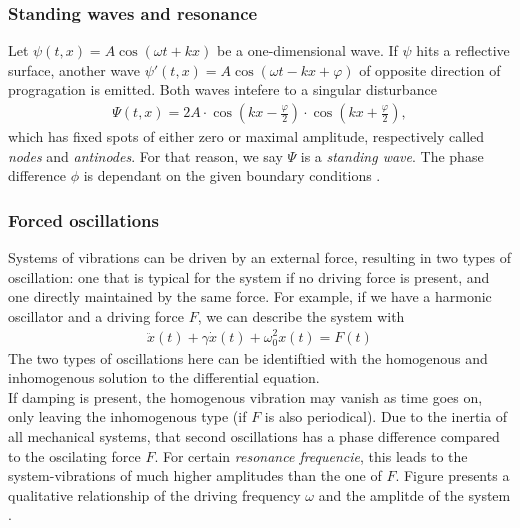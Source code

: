 \documentclass{subfiles}
\begin{document}
        \subsubsection*{Standing waves and resonance}
        Let $\psi(t,x)=A\cos(\omega t+kx)$ be a one-dimensional wave. If $\psi$ hits a reflective surface, another wave $\psi'(t,x)=A\cos(\omega t-kx+\varphi)$ of opposite direction of progragation is emitted. Both waves intefere to a singular disturbance
        \begin{align*}
            \Psi(t,x)=2A\cdot\cos(kx-\frac{\varphi}{2})\cdot\cos(kx+\frac{\varphi}{2}),
        \end{align*}
        which has fixed spots of either zero or maximal amplitude, respectively called \textit{nodes} and \textit{antinodes}. For that reason, we say $\Psi$ is a \textit{standing wave}. The phase difference $\phi$ is dependant on the given boundary conditions \cite[p.405]{demtroeder1.9}.\\

        \subsubsection*{Forced oscillations}
            Systems of vibrations can be driven by an external force, resulting in two types of oscillation: one that is typical for the system if no driving force is present, and one directly maintained by the same force. For example, if we have a harmonic oscillator and a driving force $F$, we can describe the system with
            \begin{align*}
                \ddot x(t)+\gamma\dot x(t)+\omega_0^2x(t)=F(t)
            \end{align*}
            The two types of oscillations here can be identiftied with the homogenous and inhomogenous solution to the differential equation.\\

            \noindent If damping is present, the homogenous vibration may vanish as time goes on, only leaving the inhomogenous type (if $F$ is also periodical). Due to the inertia of all mechanical systems, that second oscillations has a phase difference compared to the oscilating force $F$. For certain \textit{resonance frequencie}, this leads to the system-vibrations of much higher amplitudes than the one of $F$. Figure presents a qualitative relationship of the driving frequency $\omega$ and the amplitde of the system \cite[374-377]{demtroeder1.9}.
\end{document}
